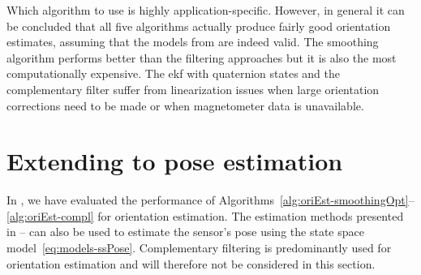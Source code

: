 Which algorithm to use is highly application-specific. However, in general it can be concluded that all five algorithms actually produce fairly good orientation estimates, assuming that the models from  are indeed valid. The smoothing algorithm performs better than the filtering approaches but it is also the most computationally expensive. The \gls{ekf} with quaternion states and the complementary filter suffer from linearization issues when large orientation corrections need to be made or when magnetometer data is unavailable.

\section{Extending to pose estimation}
\label{sec:oriEst-poseEstimation}
In , we have evaluated the performance of Algorithms~\ref{alg:oriEst-smoothingOpt}--\ref{alg:oriEst-compl} for orientation estimation. The estimation methods presented in -- can also be used to estimate the sensor's pose using the state space model~\eqref{eq:models-ssPose}. Complementary filtering is predominantly used for orientation estimation and will therefore not be considered in this section. 

